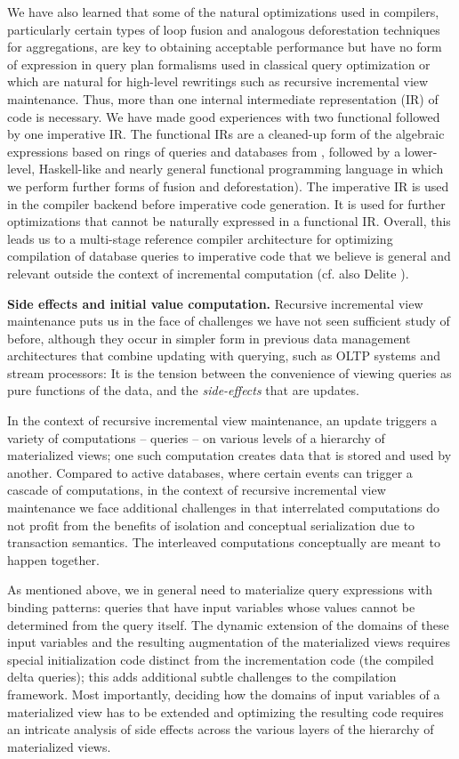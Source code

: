 We have also learned that some of the natural optimizations used in compilers, particularly certain types of loop fusion and analogous deforestation techniques for aggregations, are key to obtaining acceptable performance but have no form of expression in query plan formalisms used in classical query optimization or which are natural for high-level rewritings such as recursive incremental view maintenance. Thus, more than one internal intermediate representation (IR) of code is necessary. We have made good experiences with two functional followed by one imperative IR. The functional IRs are a cleaned-up form of the algebraic expressions based on rings of queries and databases from \cite{koch-pods:10}, followed by a lower-level, Haskell-like and nearly general functional programming language in which we perform further forms of fusion and deforestation). The imperative IR is used in the compiler backend before imperative code generation. It is used for further optimizations that cannot be naturally expressed in a functional IR. Overall, this leads us to a multi-stage reference compiler architecture for optimizing compilation of database queries to imperative code that we believe is general and relevant outside the context of incremental computation (cf. also Delite \cite{delite:11}).


{\bf Side effects and initial value computation.}
%
Recursive incremental view maintenance puts us in the face of challenges we have not seen sufficient study of before, although they occur in simpler form in previous data management architectures that combine updating with querying, such as OLTP systems and stream processors: It is the tension between the convenience of viewing queries as pure functions of the data, and the {\em side-effects} that are updates.

In the context of recursive incremental view maintenance, an update triggers a variety of computations -- queries -- on various levels of a hierarchy of materialized views; one such computation creates data that is stored and used by another. Compared to active databases, where certain events can trigger a cascade of computations, in the context of recursive incremental view maintenance we face additional challenges in that interrelated computations do not profit from the benefits of isolation and conceptual serialization due to transaction semantics. The interleaved computations conceptually are meant to happen together.

As mentioned above, we in general need to materialize query expressions with binding patterns: queries that have input variables whose values cannot be determined from the query itself. The dynamic extension of the domains of these input variables and the resulting augmentation of the materialized views requires special initialization code distinct from the incrementation code (the compiled delta queries); this adds additional subtle challenges to the compilation framework. Most importantly, deciding how the domains of input variables of a materialized view has to be extended and optimizing the resulting code requires an intricate analysis of side effects across the various layers of the hierarchy of materialized views.



